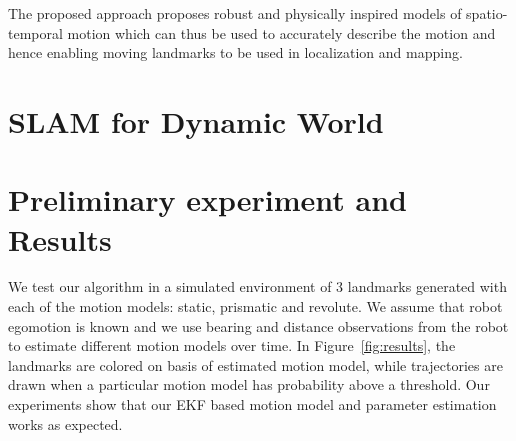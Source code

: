 \documentclass[10pt,twocolumn,letterpaper]{article}
\begin{document}
The proposed approach proposes robust and physically inspired models of spatio-temporal motion which can thus be used to accurately describe the motion and hence enabling moving landmarks to be used in localization and mapping.

\section{SLAM for Dynamic World}

\section{Preliminary experiment and Results}
We test our algorithm in a simulated environment of 3 landmarks generated with each of the motion models: static, prismatic and revolute. We assume that robot egomotion is known and we use bearing and distance observations from the robot to estimate different motion models over time. In Figure~\ref{fig:results}, the landmarks are colored on basis of estimated motion model, while trajectories are drawn when a particular motion model has probability above a threshold. Our experiments show that our EKF based motion model and parameter estimation works as expected.

\begin{figure*}[t]
  \usetikzlibrary{calc}
  \centering
  
  \caption{Frames at different time intervals of our simulation.
  Color of a landmark at a particular frame is the weighted sum of colors
  assigned to each motion model. The weights used are the probability of the
  landmark following that particular motion model and estimated by our algorithm. We also show the predicted trajectory of a landmark according to the estimated motion model.}
  \label{fig:results}
\end{figure*}

{\small


}
\end{document}
